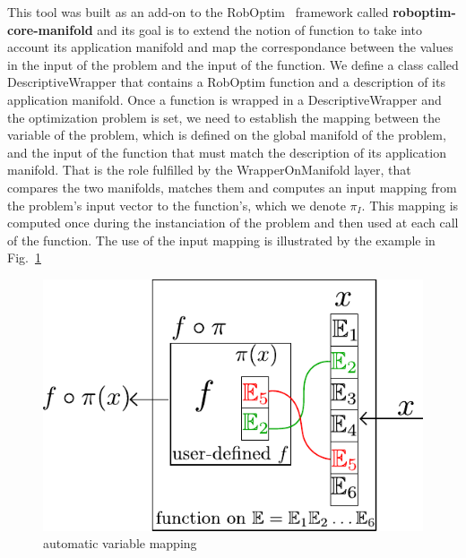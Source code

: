 This tool was built as an add-on to the RobOptim~\cite{moulard:jsme:2013} framework called {\bf roboptim-core-manifold} and its goal is to extend the notion of function to take into account its application manifold and map the correspondance between the values in the input of the problem and the input of the function.
We define a class called DescriptiveWrapper that contains a RobOptim function and a description of its application manifold.
Once a function is wrapped in a DescriptiveWrapper and the optimization problem is set, we need to establish the mapping between the variable of the problem, which is defined on the global manifold of the problem, and the input of the function that must match the description of its application manifold.
That is the role fulfilled by the WrapperOnManifold layer, that compares the two manifolds, matches them and computes an input mapping from the problem's input vector to the function's, which we denote $\pi_I$.
This mapping is computed once during the instanciation of the problem and then used at each call of the function.
The use of the input mapping is illustrated by the example in Fig.~\ref{fig:auto_map}

\begin{figure}[!htb]
\centering
  \centering
  \setlength\fboxsep{0pt}
  \includegraphics[width=.5\linewidth]{auto_mapping_text.pdf}
\caption{automatic variable mapping}
\label{fig:auto_map}
\end{figure}



